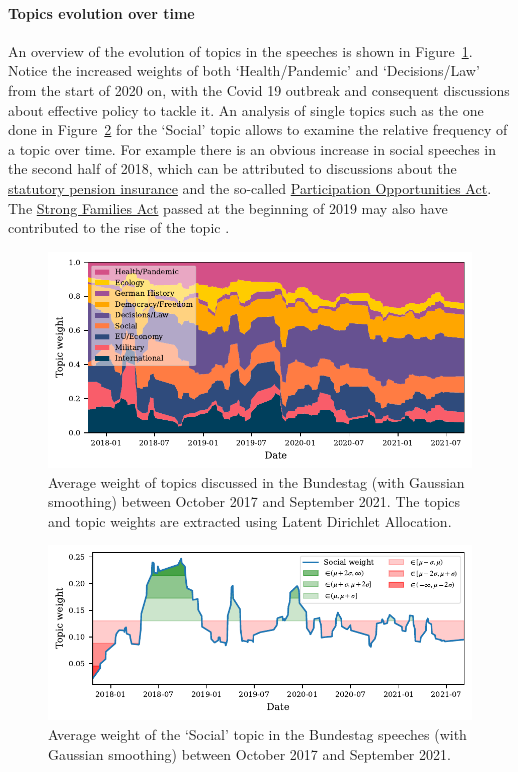 \documentclass{article}
\begin{document}
\paragraph{Topics evolution over time}
An overview of the evolution of topics in the speeches is shown in Figure~\ref{stacked_area_plot}.
Notice the increased weights of both `Health/Pandemic' and `Decisions/Law' from the start of 2020 on, with the Covid 19 outbreak and consequent discussions about effective policy to tackle it.
An analysis of single topics such as the one done in Figure~\ref{social_topic_plot} for the `Social' topic allows to examine the relative frequency of a topic over time. 
For example there is an obvious increase in social speeches in the second half of 2018, which can be attributed to discussions about the \href{https://dserver.bundestag.de/btd/19/054/1905412.pdf}{statutory pension insurance} and the so-called \href{https://dserver.bundestag.de/btd/19/047/1904725.pdf}{Participation Opportunities Act}. 
The \href{https://dserver.bundestag.de/btd/19/075/1907504.pdf}{Strong Families Act} passed at the beginning of 2019 may also have contributed to the rise of the topic \cite{Bundestag2018}\cite{Bundestag2019}.

\begin{figure}
  \centering
  \includegraphics[width=0.9\linewidth]{images/stacked_area_plot.pdf}
  \captionsetup{width=0.9\linewidth}
  \caption{
    Average weight of topics discussed in the Bundestag (with Gaussian smoothing) between October 2017 and September 2021.
    The topics and topic weights are extracted using Latent Dirichlet Allocation.
  }
  \label{stacked_area_plot}
\end{figure}

\begin{figure}
  \centering
  \includegraphics[width=0.9\linewidth]{images/Social.pdf}
  \captionsetup{width=0.9\linewidth}
  \caption{
    Average weight of the `Social' topic in the Bundestag speeches (with Gaussian smoothing) between October 2017 and September 2021.
  }
  \label{social_topic_plot}
\end{figure}
\end{document}
